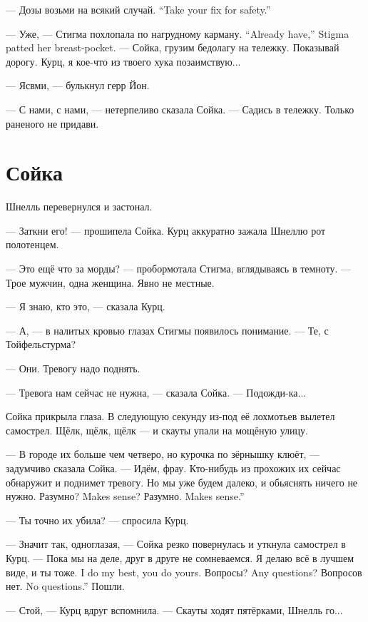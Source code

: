 {--- Дозы возьми на всякий случай.}
{``Take your fix for safety.''}

{--- Уже, --- Стигма похлопала по нагрудному карману.}
{``Already have,'' Stigma patted her breast-pocket.}
--- Сойка, грузим бедолагу на тележку.
Показывай дорогу.
Курц, я кое-что из твоего хука позаимствую...

--- Ясвми, --- булькнул герр Йон.

--- С нами, с нами, --- нетерпеливо сказала Сойка.
--- Садись в тележку.
Только раненого не придави.

\section{Сойка}

Шнелль перевернулся и застонал.

--- Заткни его! --- прошипела Сойка.
Курц аккуратно зажала Шнеллю рот полотенцем.

--- Это ещё что за морды? --- пробормотала Стигма, вглядываясь в темноту.
--- Трое мужчин, одна женщина.
Явно не местные.

--- Я знаю, кто это, --- сказала Курц.

--- А, --- в налитых кровью глазах Стигмы появилось понимание.
--- Те, с Тойфельстурма?

--- Они.
Тревогу надо поднять.

--- Тревога нам сейчас не нужна, --- сказала Сойка.
--- Подожди-ка...

Сойка прикрыла глаза.
В следующую секунду из-под её лохмотьев вылетел самострел.
Щёлк, щёлк, щёлк --- и скауты упали на мощёную улицу.

--- В городе их больше чем четверо, но курочка по зёрнышку клюёт, --- задумчиво сказала Сойка.
--- Идём, фрау.
Кто-нибудь из прохожих их сейчас обнаружит и поднимет тревогу.
Но мы уже будем далеко, и обьяснять ничего не нужно.
{Разумно?}
{Makes sense?}
{Разумно.}
{Makes sense.''}

--- Ты точно их убила? --- спросила Курц.

--- Значит так, одноглазая, --- Сойка резко повернулась и уткнула самострел в Курц.
--- Пока мы на деле, друг в друге не сомневаемся.
{Я делаю всё в лучшем виде, и ты тоже.}
{I do my best, you do yours.}
{Вопросы?}
{Any questions?}
{Вопросов нет.}
{No questions.''}
Пошли.

--- Стой, --- Курц вдруг вспомнила.
--- Скауты ходят пятёрками, Шнелль го...

